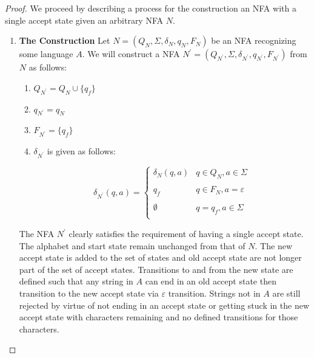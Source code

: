 \documentclass[10pt]{article}
\theoremstyle{definition}
\begin{document}
\begin{proof}
We proceed by describing a process for the construction an NFA with a single accept state given an arbitrary NFA $N$.

\begin{enumerate}
  \item \textbf{The Construction} Let $N = (Q_N,\Sigma,\delta_N,q_N,F_N)$ be an NFA recognizing some language $A$. We will construct a NFA $N^\prime = (Q_{N^\prime},\Sigma,\delta_{N^\prime},q_{N^\prime},F_{N^\prime})$ from $N$ as follows:

  \begin{enumerate}[ label=\textbf{\roman*.} ]

    \item $Q_{N^\prime} = Q_N \cup \{ q_f \}$

    \item $q_{N^\prime} = q_N$

    \item $F_{N^\prime} = \{ q_f \}$

    \item $\delta_{N^\prime}$ is given as follows:

    \begin{equation*}
      \delta_{N^\prime}(q,a) = \left\{ %
      \begin{array}{ll}
        \delta_N(q,a) & q \in Q_N, a \in \Sigma \\ \\
        q_f & q \in F_N, a = \varepsilon \\ \\
        \emptyset & q = q_f, a \in \Sigma \\
      \end{array}
      \right.
    \end{equation*}

  \end{enumerate}

The NFA $N^\prime$ clearly satisfies the requirement of having a single accept state. The alphabet and start state remain unchanged from that of $N$.  The new accept state is added to the set of states and old accept state are not longer part of the set of accept states. Transitions to and from the new state are defined such that any string in $A$ can end in an old accept state then transition to the new accept state via $\varepsilon$ transition. Strings not in $A$ are still rejected by virtue of not ending in an accept state or getting stuck in the new accept state with characters remaining and no defined transitions for those characters.


\end{enumerate}
\end{proof}
\end{document}
